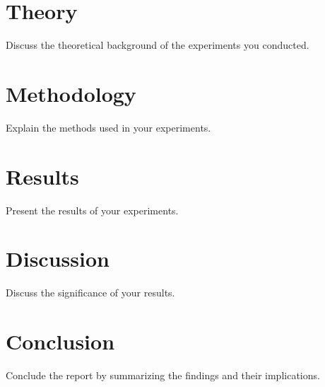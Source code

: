 \documentclass[15pt,a4paper]{article}
\begin{document}
\section{Theory}
Discuss the theoretical background of the experiments you conducted.

\section{Methodology}
Explain the methods used in your experiments.

\section{Results}
Present the results of your experiments.

\section{Discussion}
Discuss the significance of your results.

\section{Conclusion}
Conclude the report by summarizing the findings and their implications.
\end{document}
